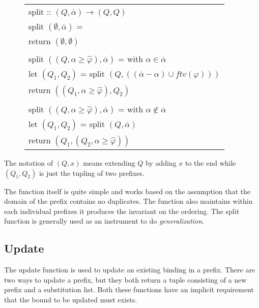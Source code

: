 \begin{figure}[H]
\begin{tabular}[t]{l}
split :: $(Q, \overline{\alpha}) \rightarrow (Q,Q)$\\
split $(\emptyset, \overline{\alpha})$ = \\
\hspace{15pt} return $(\emptyset, \emptyset)$ \\
\\
split $((Q,\alpha \geq \hat{\varphi}),\overline{\alpha})$ = \hspace{15pt} with \hspace{5pt} $\alpha \in \overline{\alpha}$ \\
\hspace{15pt} let $(Q_1, Q_2)$ = split $(Q,((\overline{\alpha} - \alpha)\cup ftv(\varphi)))$ \\
\hspace{15pt} return $((Q_1, \alpha \geq \hat{\varphi}), Q_2)$ \\
\\
split $((Q,\alpha \geq \hat{\varphi}),\overline{\alpha})$ = \hspace{15pt} with \hspace{5pt} $\alpha \notin \overline{\alpha}$ \\
\hspace{15pt} let $(Q_1, Q_2)$ = split $(Q,\overline{\alpha})$ \\
\hspace{15pt} return $(Q_1, (Q_2, \alpha \geq \hat{\varphi}))$ \\
\end{tabular}
\end{figure}
The notation of $(Q,x)$ means extending $Q$ by adding $x$ to the end while $(Q_1, Q_2)$ is just the tupling of two prefixes.

The function itself is quite simple and works based on the assumption that the domain of the prefix contains no duplicates. The function also maintains within each individual prefixes it produces the invariant on the ordering. The split function is generally used as an instrument to do \emph{generalization}.
\subsection{Update}
The update function is used to update an existing binding in a prefix. There are two ways to update a prefix, but they both return a tuple consisting of a new prefix and a substitution list. Both these functions have an implicit requirement that the bound to be updated must exists.
